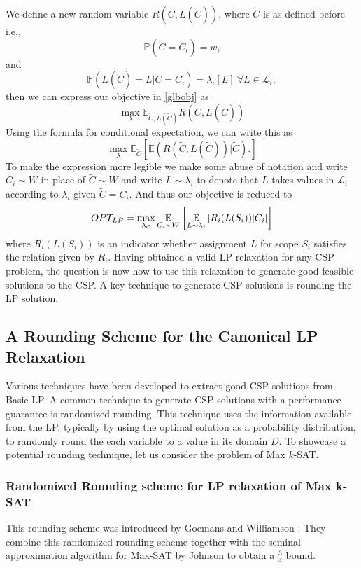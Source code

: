 We define a new random variable $R(\tilde{C}, L(\tilde{C}))$, where $\tilde{C}$ is as defined before i.e., 
$$\mathbb{P} (\tilde{C} = C_i ) = w_i$$
and 
$$\mathbb{P}(L(\tilde{C}) = L |\tilde{C}=C_i ) =  \lambda_i[L]\  \forall L \in \mathcal{L}_i,$$ 
then we can express our objective in \ref{glbobj} as 
\begin{equation}
\max_\lambda \mathbb{E}_{\tilde{C}, L(\tilde{C})} R(\tilde{C}, L(\tilde{C}))
\end{equation}
Using the formula for conditional expectation, we can write this as 
\begin{equation}
\max_\lambda \mathbb{E}_{\tilde{C}} \left[ \mathbb{E} \left(R(\tilde{C}, L(\tilde{C}))\displaystyle|\tilde{C}\right). \right] \label{eq:tower}
\end{equation}
To make the expression more legible we make some abuse of notation and write $C_i \sim W$ in place of $\tilde{C} \sim W$ and write $L \sim \lambda_i$ to denote that $L$ takes values in $\mathcal L_i$ according to $\lambda_i$ given $\tilde{C} = C_i$. And thus our objective is reduced to
\[
	OPT_{LP} = \max_{\lambda_{\mathcal{C}}} \underset{C_i \sim W}{\mathbb{E}} \left[ \underset{L \sim \lambda_{i}}{\mathbb{E}} \left[ R_i( L (S_i )) |C_i \right] \right]
\]
where $R_i( L (S_i ))$ is an indicator whether assignment $L$ for scope $S_i$ satisfies the relation given by $R_i$.
Having obtained a valid LP relaxation for any CSP problem, the question is now how to use this relaxation to generate good feasible solutions to the CSP. 
A key technique to generate CSP solutions is rounding the LP solution.


\subsection{A Rounding Scheme for the Canonical LP Relaxation}
Various techniques have been developed to extract good CSP solutions from Basic LP.
A common technique to generate CSP solutions with a performance guarantee is randomized rounding.
This technique uses the information available from the LP, typically by using the optimal solution as a probability distribution, to randomly round the each variable to a value in its domain $D$.
To showcase a potential rounding technique, let us consider the problem of Max $k$-SAT. 

\subsubsection{Randomized Rounding scheme for LP relaxation of Max k-SAT}\label{sec:lpRoundingSat}
This rounding scheme was introduced by Goemans and Williamson \cite{GoeWil94}. They combine this randomized rounding scheme together with the seminal approximation algorithm for Max-SAT by Johnson \cite{Joh73} to obtain a $\frac{3}{4}$ bound.
 
